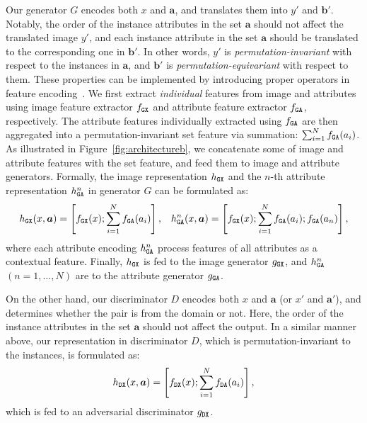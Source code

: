 \documentclass{article} \usepackage{iclr2019_conference,times}
\begin{document}
Our generator $G$ encodes both $x$ and $\bm{a}$, and translates them into $y'$ and $\bm{b}'$.
Notably, the order of the instance attributes in the set $\bm{a}$ should not affect the translated image $y'$, and each instance attribute in the set $\bm{a}$ should be translated to the corresponding one in $\bm{b}'$. In other words, $y'$ is \textit{permutation-invariant} with respect to the instances in $\bm{a}$, and $\bm{b}'$  is \textit{permutation-equivariant} with respect to them. These properties can be implemented by introducing proper operators in feature encoding~\citep{zaheer2017deep}. 
We first extract \textit{individual} features from image and attributes using image feature extractor $f_{\tt GX}$ and attribute feature extractor $f_{\tt GA}$, respectively. The attribute features individually extracted using $f_{\tt GA}$ are then aggregated into a permutation-invariant set feature via summation: $\sum_{i=1}^N f_{\tt GA}(a_i)$. 
As illustrated in Figure~\ref{fig:architectureb}, we concatenate some of image and attribute features with the set feature, and feed them to image and attribute generators.
{Formally,
the image representation $h_{\tt GX}$ and the $n$-th attribute representation $h^n_{\tt GA}$ in generator $G$ can be formulated as: 
}
\begin{equation}
	h_{\tt GX}(x,\bm{a}) = \left[ f_{\tt GX}(x); \sum_{i=1}^N f_{\tt GA}(a_i) \right], \;\;\;
	h_{\tt GA}^n(x,\bm{a}) = \left[ f_{\tt GX}(x); \sum_{i=1}^N f_{\tt GA}(a_i); f_{\tt GA}(a_n) \right],
\end{equation}
where each attribute encoding $h_{\tt GA}^n$ process features of all attributes as a contextual feature.  
Finally, $h_{\tt GX}$ is fed to the image generator $g_{\tt GX}$, and $h_{\tt GA}^n$ $(n=1,\dots,N)$ are to the attribute generator $g_{\tt GA}$.


On the other hand, our discriminator $D$ encodes both $x$ and $\bm{a}$ {(or $x'$ and $\bm{a}'$)},
and determines whether the pair is from the domain or not. Here, the order of the instance attributes in the set $\bm{a}$ should not affect the output. 
In a similar manner above, our representation in discriminator $D$, which is permutation-invariant to the instances, is formulated as:
\begin{equation}
	h_{\tt DX}(x,\bm{a}) = \left[ f_{\tt DX}(x); \sum_{i=1}^N f_{\tt DA}(a_i) \right], 
\end{equation}
which is fed to an adversarial discriminator $g_{\tt DX}$. 
\end{document}
